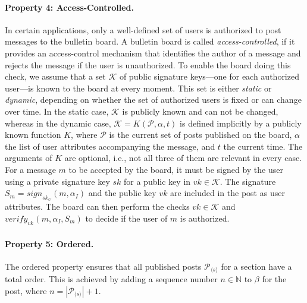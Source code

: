 \documentclass[bibtotoc,halfparskip,oneside]{scrreprt}
\newcommand{\vk}[1]{\mathit{vk}_{#1}\xspace}
\begin{document}
\paragraph*{Property 4: Access-Controlled.}

In certain applications, only a well-defined set of users is authorized to post messages to the bulletin board. A bulletin board is called \emph{access-controlled}, if it provides an access-control mechanism that identifies the author of a message and rejects the message if the user is unauthorized. To enable the board doing this check, we assume that a set $\mathcal{K}$ of public signature keys---one for each authorized user---is known to the board at every moment. This set is either \emph{static} or \emph{dynamic}, depending on whether the set of authorized users is fixed or can change over time. In the static case, $\mathcal{K}$ is publicly known and can not be changed, whereas in the dynamic case, $\mathcal{K}=K(\mathcal{P}, \alpha, t)$ is defined implicitly by a publicly known function $K$, where $\mathcal{P}$ is the current set of posts published on the board, $\alpha$ the list of user attributes accompanying the message, and $t$ the current time. The arguments of $K$ are optional, i.e., not all three of them are relevant in every case. For a message $m$ to be accepted by the board, it must be signed by the user using a private signature key $sk$ for a public key in $vk\in\mathcal{K}$. The signature $S_m=\mathit{sign}_{sk_U}(m, \alpha_I)$ and the public key $vk$ are included in the post as user attributes. The board can then perform the checks $vk\in\mathcal{K}$ and $\mathit{verify}_{\vk{}}(m,\alpha_I,S_m)$ to decide if the user of $m$ is authorized.

\paragraph*{Property 5: Ordered.}

The ordered property ensures that all published posts $\mathcal{P}_{\langle s\rangle}$ for a section have a total order. This is achieved by adding a sequence number $n\in\mathbb{N}$ to $\beta$ for the post, where $n=|\mathcal{P}_{\langle s\rangle}|+1$.
\end{document}
